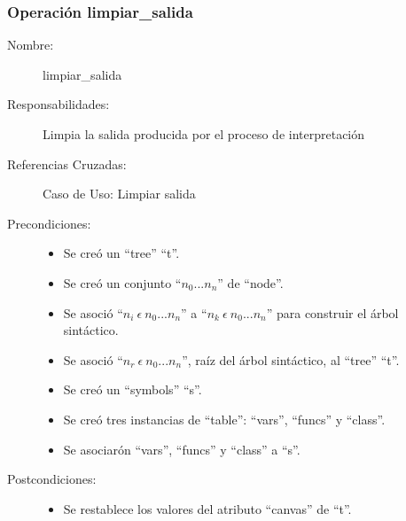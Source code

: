 \subsubsection{Operación limpiar\_salida}
\FloatBarrier
\begin{framed}
	\begin{description}
		\item [Nombre:] limpiar\_salida
		\item [Responsabilidades:] Limpia la salida producida por el proceso de interpretación
		\item [Referencias Cruzadas: ] Caso de Uso: Limpiar salida
      \item [Precondiciones:] \hfill
         \begin {itemize}
         \item Se creó un ``tree'' ``t''.
         \item Se creó un conjunto ``$n_0...n_n$'' de ``node''.
         \item Se asoció ``$n_i\ \epsilon\ n_0...n_n$'' a ``$n_k\ \epsilon\ n_0...n_n$'' para construir el árbol sintáctico.
         \item Se asoció  ``$n_r\ \epsilon\ n_0...n_n$'', raíz del árbol sintáctico, al ``tree'' ``t''.
         \item Se creó un ``symbols'' ``s''.
         \item Se creó tres instancias de ``table'': ``vars'', ``funcs'' y ``class''.
         \item Se asociarón ``vars'', ``funcs'' y ``class'' a ``s''.
      \end{itemize}
      \item [Postcondiciones:] \hfill
      \begin {itemize}
         \item Se restablece los valores del atributo ``canvas'' de ``t''.
      \end{itemize}
	\end{description} 
\end{framed}
\FloatBarrier

